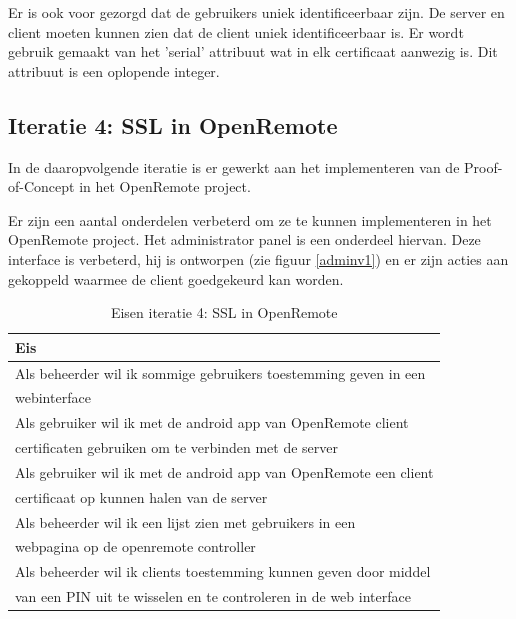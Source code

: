 \documentclass[]{article}
\begin{document}
Er is ook voor gezorgd dat de gebruikers uniek identificeerbaar zijn. De server
en client moeten kunnen zien dat de client uniek identificeerbaar is. Er wordt
gebruik gemaakt van het 'serial' attribuut wat in elk certificaat aanwezig is.
Dit attribuut is een oplopende integer.

\subsection{Iteratie 4: SSL in OpenRemote}
In de daaropvolgende iteratie is er gewerkt aan het implementeren van de
Proof-of-Concept in het OpenRemote project.

Er zijn een aantal onderdelen verbeterd om ze te kunnen implementeren in het
OpenRemote project. Het administrator panel
is een onderdeel hiervan. Deze interface is verbeterd, hij is
ontworpen (zie figuur \ref{adminv1}) en er zijn acties aan gekoppeld 
waarmee de client goedgekeurd kan worden.

\begin{table}[htpb]
  \caption{Eisen iteratie 4: SSL in OpenRemote}
  \begin{center}
    \begin{tabular}{|| l ||}\hline
        Eis                                                              \\\hline\hline
        Als beheerder wil ik sommige gebruikers toestemming geven in een \\ 
        webinterface                                                     \\\hline
        Als gebruiker wil ik met de android app van OpenRemote client    \\ 
        certificaten gebruiken om te verbinden met de server             \\\hline
        Als gebruiker wil ik met de android app van OpenRemote een client\\
        certificaat op kunnen halen van de server                        \\\hline
        Als beheerder wil ik een lijst zien met gebruikers in een        \\ 
        webpagina op de openremote controller                            \\\hline
        Als beheerder wil ik clients toestemming kunnen geven door middel\\ 
        van een PIN uit te wisselen en te controleren in de web interface\\\hline
    \end{tabular}
  \end{center}
\end{table}
\end{document}
